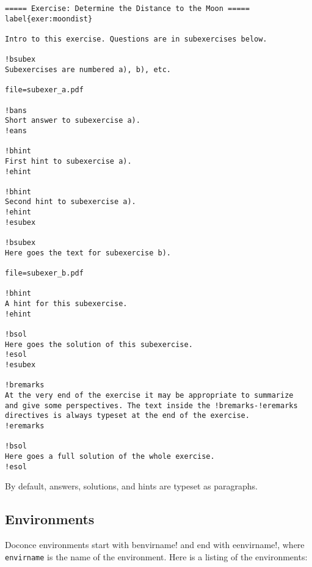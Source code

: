 \documentclass[%
oneside,                 %
final,                   %
10pt]{article}
\begin{document}
\begin{Verbatim}[numbers=none,fontsize=\fontsize{9pt}{9pt},baselinestretch=0.85,xleftmargin=0mm]
===== Exercise: Determine the Distance to the Moon =====
label{exer:moondist}

Intro to this exercise. Questions are in subexercises below.

!bsubex
Subexercises are numbered a), b), etc.

file=subexer_a.pdf

!bans
Short answer to subexercise a).
!eans

!bhint
First hint to subexercise a).
!ehint

!bhint
Second hint to subexercise a).
!ehint
!esubex

!bsubex
Here goes the text for subexercise b).

file=subexer_b.pdf

!bhint
A hint for this subexercise.
!ehint

!bsol
Here goes the solution of this subexercise.
!esol
!esubex

!bremarks
At the very end of the exercise it may be appropriate to summarize
and give some perspectives. The text inside the !bremarks-!eremarks
directives is always typeset at the end of the exercise.
!eremarks

!bsol
Here goes a full solution of the whole exercise.
!esol

\end{Verbatim}
By default, answers, solutions, and hints are typeset as paragraphs.

\subsection{Environments}

Doconce environments start with \Verb!!benvirname! and end with \Verb!!eenvirname!,
where \Verb!envirname! is the name of the environment. Here is a listing of
the environments:
\end{document}
